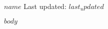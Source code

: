 \documentclass[10pt]{article}
\def\name{$name$}
\begin{document}
{\huge \name} \hfill {Last updated: $last_updated$}

$body$
\end{document}

